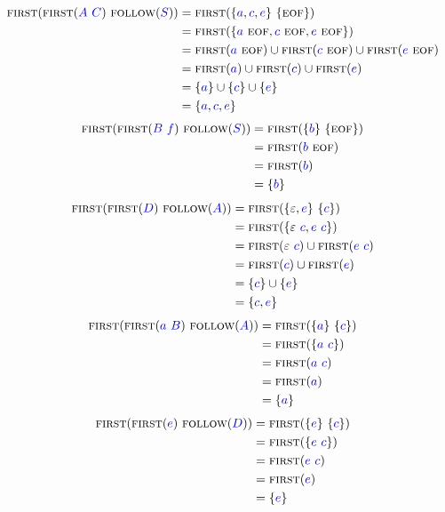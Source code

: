 \documentclass{article}
\newcommand{\FIRST}{\textsc{first}}
\newcommand{\FOLLOW}{\textsc{follow}}
\newcommand{\EOF}{\textsc{eof}}
\newcommand{\Symbol}[1]{\textcolor{blue}{#1}}
\newcommand{\Null}{\varepsilon}
\newcommand{\Seq}{\ }
\begin{document}
\begin{align*}
  \FIRST(\FIRST(\Symbol{A} \Seq \Symbol{C}) \Seq \FOLLOW(\Symbol{S})) &= \FIRST(\{\Symbol{a}, \Symbol{c}, \Symbol{e}\} \Seq \{\EOF\})\\
  &= \FIRST(\{\Symbol{a} \Seq \EOF, \Symbol{c} \Seq \EOF, \Symbol{e} \Seq \EOF\})\\
  &= \FIRST(\Symbol{a} \Seq \EOF) \cup \FIRST(\Symbol{c} \Seq \EOF) \cup \FIRST(\Symbol{e} \Seq \EOF)\\
  &= \FIRST(\Symbol{a}) \cup \FIRST(\Symbol{c}) \cup \FIRST(\Symbol{e})\\
  &= \{\Symbol{a}\} \cup \{\Symbol{c}\} \cup \{\Symbol{e}\}\\
  &= \{\Symbol{a}, \Symbol{c}, \Symbol{e}\}
\end{align*}
\begin{align*}
  \FIRST(\FIRST(\Symbol{B} \Seq \Symbol{f}) \Seq \FOLLOW(\Symbol{S})) &= \FIRST(\{\Symbol{b}\} \Seq \{\EOF\})\\
  &= \FIRST(\Symbol{b} \Seq \EOF)\\
  &= \FIRST(\Symbol{b}) \\ 
  &= \{\Symbol{b}\} 
\end{align*}
\begin{align*}
  \FIRST(\FIRST(\Symbol{D}) \Seq \FOLLOW(\Symbol{A})) &= \FIRST(\{\Null, \Symbol{e}\} \Seq \{\Symbol{c}\})\\
  &= \FIRST(\{\Null \Seq \Symbol{c}, \Symbol{e} \Seq \Symbol{c}\})\\
  &= \FIRST(\Null \Seq \Symbol{c}) \cup \FIRST(\Symbol{e} \Seq \Symbol{c})\\
  &= \FIRST(\Symbol{c}) \cup \FIRST(\Symbol{e})\\
  &= \{\Symbol{c}\} \cup \{\Symbol{e}\}\\
  &= \{\Symbol{c}, \Symbol{e}\}
\end{align*}
\begin{align*}
  \FIRST(\FIRST(\Symbol{a} \Seq \Symbol{B}) \Seq \FOLLOW(\Symbol{A})) &= \FIRST(\{\Symbol{a}\} \Seq \{\Symbol{c}\})\\
  &= \FIRST(\{\Symbol{a} \Seq \Symbol{c}\})\\
  &= \FIRST(\Symbol{a} \Seq \Symbol{c})\\ 
  &= \FIRST(\Symbol{a})\\
  &= \{\Symbol{a}\}
\end{align*}
\begin{align*}
  \FIRST(\FIRST(\Symbol{e}) \Seq \FOLLOW(\Symbol{D})) &= \FIRST(\{\Symbol{e}\} \Seq \{\Symbol{c}\})\\
  &= \FIRST(\{\Symbol{e} \Seq \Symbol{c}\})\\
  &= \FIRST(\Symbol{e} \Seq \Symbol{c})\\ 
  &= \FIRST(\Symbol{e})\\
  &= \{\Symbol{e}\}
\end{align*}
\end{document}

